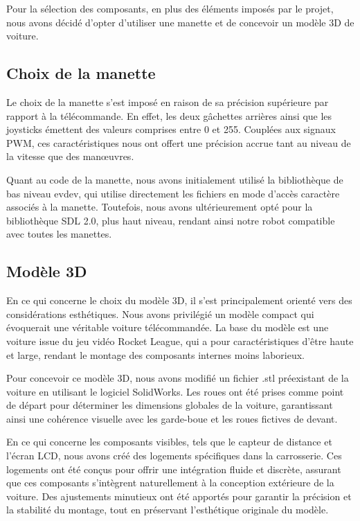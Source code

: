 Pour la sélection des composants, en plus des éléments imposés par le projet, nous avons décidé d'opter d'utiliser une manette et de concevoir un modèle 3D de voiture.

\subsection{Choix de la manette}
Le choix de la manette s'est imposé en raison de sa précision supérieure par rapport à la télécommande. En effet, les deux gâchettes arrières ainsi que les joysticks émettent des valeurs comprises entre 0 et 255. Couplées aux signaux PWM, ces caractéristiques nous ont offert une précision accrue tant au niveau de la vitesse que des manœuvres.

Quant au code de la manette, nous avons initialement utilisé la bibliothèque de bas niveau evdev, qui utilise directement les fichiers en mode d'accès caractère associés à la manette. Toutefois, nous avons ultérieurement opté pour la bibliothèque SDL 2.0, plus haut niveau, rendant ainsi notre robot compatible avec toutes les manettes.

\subsection{Modèle 3D}
En ce qui concerne le choix du modèle 3D, il s'est principalement orienté vers des considérations esthétiques. Nous avons privilégié un modèle compact qui évoquerait une véritable voiture télécommandée. La base du modèle est une voiture issue du jeu vidéo Rocket League, qui a pour caractéristiques d'être haute et large, rendant le montage des composants internes moins laborieux.

Pour concevoir ce modèle 3D, nous avons modifié un fichier .stl préexistant de la voiture en utilisant le logiciel SolidWorks. Les roues ont été prises comme point de départ pour déterminer les dimensions globales de la voiture, garantissant ainsi une cohérence visuelle avec les garde-boue et les roues fictives de devant. 

En ce qui concerne les composants visibles, tels que le capteur de distance et l'écran LCD, nous avons créé des logements spécifiques dans la carrosserie. Ces logements ont été conçus pour offrir une intégration fluide et discrète, assurant que ces composants s'intègrent naturellement à la conception extérieure de la voiture. Des ajustements minutieux ont été apportés pour garantir la précision et la stabilité du montage, tout en préservant l'esthétique originale du modèle.

